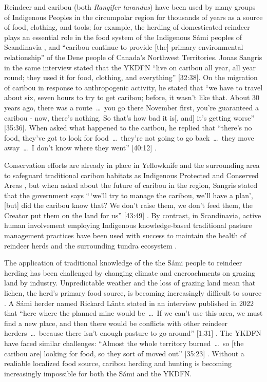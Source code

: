 \documentclass{report}
\begin{document}
\hspace{24pt} Reindeer and caribou (both \textit{Rangifer tarandus}) have been used by many groups of Indigenous Peoples in the circumpolar region for thousands of years as a source of food, clothing, and tools; for example, the herding of domesticated reindeer plays an essential role in the food system of the Indigenous S\'ami peoples of Scandinavia \parencite{traditionalsiberia}, and ``caribou continue to provide [the] primary environmental relationship'' \parencite[225]{denefoodwaysontologies} of the Dene people of Canada's Northwest Territories. 
Jonas Sangris in the same interview stated that the YKDFN ``live on caribou all year, all year round; they used it for food, clothing, and everything'' [32:38].
On the migration of caribou in response to anthropogenic activity, he stated that ``we have to travel about six, seven hours to try to get caribou; before, it wasn't like that. About 30 years ago, there was a route~\ldots~you go there November first, you're guaranteed a caribou - now, there's nothing. So that's how bad it is[, and] it's getting worse'' [35:36]. 
When asked what happened to the caribou, he replied that ``there's no food, they've got to look for food~\ldots~they're not going to go back~\ldots~they move away~\ldots~I don't know where they went'' [40:12] \parencite{jonassangris}.

\hspace{24pt} Conservation efforts are already in place in Yellowknife and the surrounding area to safeguard traditional caribou habitats as Indigenous Protected and Conserved Areas \parencite{resilientcommunities}, but when asked about the future of caribou in the region, Sangris stated that the government says ``\,`we'll try to manage the caribou, we'll have a plan', [but] did the caribou know that? We don't raise them, we don't feed them, the Creator put them on the land for us'' [43:49] \parencite{jonassangris}.
By contrast, in Scandinavia, active human involvement employing Indigenous knowledge-based traditional pasture management practices have been used with success to maintain the health of reindeer herds and the surrounding tundra ecosystem \parencite{reindeerfoodsovereignty}.

\hspace{24pt} The application of traditional knowledge of the the S\'ami people to reindeer herding has been challenged by changing climate and encroachments on grazing land by industry. Unpredictable weather and the loss of grazing land mean that lichen, the herd's primary food source, is becoming increasingly difficult to source \parencite{samishiftingstrategies}.
A S\'ami herder named Rickard L\"anta stated in an interview published in 2022 that ``here where the planned mine would be~\ldots~If we can't use this area, we must find a new place, and then there would be conflicts with other reindeer herders~\ldots~because there isn't enough pasture to go around'' [1:31] \parencite{samiherders}.
The YKDFN have faced similar challenges: ``Almost the whole territory burned~\ldots~so [the caribou are] looking for food, so they sort of moved out'' [35:23] \parencite{jonassangris}. Without a realiable localized food source, caribou herding and hunting is becoming increasingly impossible for both the S\'ami and the YKDFN.
\end{document}

